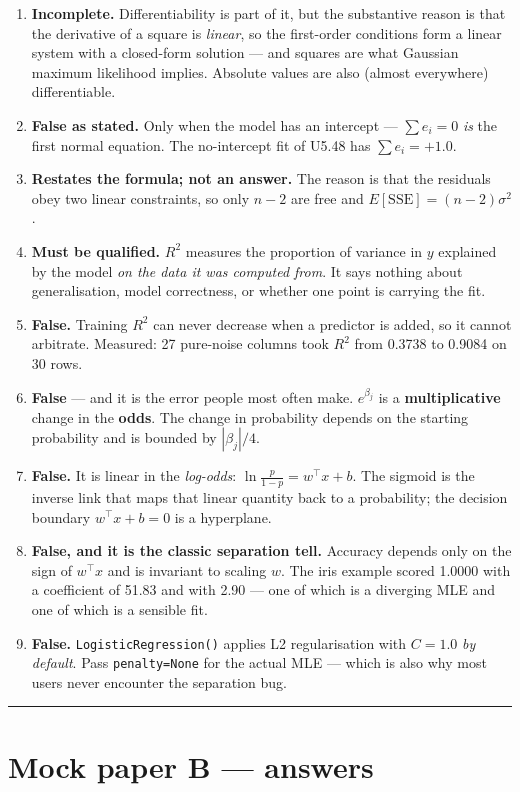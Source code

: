 \documentclass[11pt,a4paper]{article}
\newcommand{\A}[1]{\item[\textbf{#1}]}
\begin{document}
\begin{enumerate}[leftmargin=1.9cm]
\A{U5.76} \textbf{Incomplete.} Differentiability is
part of it, but the substantive reason is that the derivative of a square is
\emph{linear}, so the first-order conditions form a linear system with a
closed-form solution --- and squares are what Gaussian maximum likelihood
implies. Absolute values are also (almost everywhere) differentiable.
\A{U5.77} \textbf{False as stated.} Only when the model has an intercept ---
$\sum e_i = 0$ \emph{is} the first normal equation. The no-intercept fit of
U5.48 has $\sum e_i = +1.0$.
\A{U5.78} \textbf{Restates the formula; not an answer.} The reason is that the
residuals obey two linear constraints, so only $n-2$ are free and
$E[\text{SSE}] = (n-2)\sigma^2$.
\A{U5.79} \textbf{Must be qualified.} $R^2$ measures the proportion of variance
in $y$ explained by the model \emph{on the data it was computed from}. It says
nothing about generalisation, model correctness, or whether one point is
carrying the fit.
\A{U5.80} \textbf{False.} Training $R^2$ can never decrease when a predictor is
added, so it cannot arbitrate. Measured: 27 pure-noise columns took $R^2$ from
0.3738 to 0.9084 on 30 rows.
\A{U5.81} \textbf{False} --- and it is the error people most often make. $e^{\beta_j}$ is
a \textbf{multiplicative} change in the \textbf{odds}. The change in
probability depends on the starting probability and is bounded by
$|\beta_j|/4$.
\A{U5.82} \textbf{False.} It is linear in the \emph{log-odds}:
$\ln\frac{p}{1-p} = w^\top x + b$. The sigmoid is the inverse link that maps
that linear quantity back to a probability; the decision boundary
$w^\top x + b = 0$ is a hyperplane.
\A{U5.83} \textbf{False, and it is the classic separation tell.} Accuracy
depends only on the sign of $w^\top x$ and is invariant to scaling $w$. The
iris example scored 1.0000 with a coefficient of 51.83 and with 2.90 --- one
of which is a diverging MLE and one of which is a sensible fit.
\A{U5.84} \textbf{False.} \texttt{LogisticRegression()} applies L2
regularisation with $C = 1.0$ \emph{by default}. Pass \texttt{penalty=None} for
the actual MLE --- which is also why most users never encounter the separation
bug.
\end{enumerate}

\vspace{0.5em}\hrule

\section*{Mock paper B --- answers}
\end{document}
